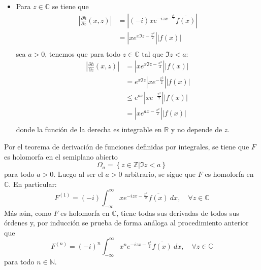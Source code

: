 \documentclass[12pt]{report}
\theoremstyle{largebreak}
\renewcommand{\leq}{\ensuremath{\leqslant}}
\newcommand\abs[1]{\ensuremath{\left|#1\right|}}
\newcommand\conj[1]{\ensuremath{\overline{#1}}}
\begin{document}
\begin{sol}
\begin{itemize}
            \item Para $z\in\mathbb{C}$ se tiene que
            \begin{equation*}
                \begin{split}
                    \abs{\frac{\partial h}{\partial z}(x,z)}&=\abs{(-i)xe^{-izx-^{\frac{x^2}{2}}}\conj{f(x)}}\\
                    &=\abs{xe^{x\Im z-\frac{x^2}{2}}}\abs{f(x)}\\
                \end{split}
            \end{equation*}
            sea $a>0$, tenemos que para todo $z\in\mathbb{C}$ tal que $\Im z<a$:
            \begin{equation*}
                \begin{split}
                    \abs{\frac{\partial h}{\partial z}(x,z)}&=\abs{xe^{x\Im z-\frac{x^2}{2}}}\abs{f(x)}\\
                    &=e^{x\Im z} \abs{xe^{-\frac{x^2}{2}}}\abs{f(x)}\\
                    &\leq e^{ ax}\abs{xe^{-\frac{x^2}{2}}}\abs{f(x)}\\
                    &=\abs{xe^{ax-\frac{x^2}{2}}}\abs{f(x)}\\
                \end{split}
            \end{equation*}
            donde la función de la derecha es integrable en $\mathbb{R}$ y no depende de $z$.
        \end{itemize}
        Por el teorema de derivación de funciones definidas por integrales, se tiene que $F$ es holomorfa en el semiplano abierto
        \begin{equation*}
            \Omega_a=\left\{z\in\mathbb{Z}\Big|\Im z<a \right\}
        \end{equation*}
        para todo $a>0$. Luego al ser el $a>0$ arbitrario, se sigue que $F$ es homolorfa en $\mathbb{C}$. En particular:
        \begin{equation*}
            F^{(1)}=(-i)\int_{-\infty}^\infty xe^{ -izx-\frac{x^2}{2}}\conj{f(x)}\:dx,\quad\forall z\in\mathbb{C}
        \end{equation*}
        Más aún, como $F$ es holomorfa en $\mathbb{C}$, tiene todas sus derivadas de todos sus órdenes y, por inducción se prueba de forma análoga al procedimiento anterior que
        \begin{equation*}
            F^{(n)}=(-i)^n\int_{-\infty}^\infty x^ne^{ -izx-\frac{x^2}{2}}\conj{f(x)}\:dx,\quad\forall z\in\mathbb{C}
        \end{equation*}
        para todo $n\in\mathbb{N}$.


\end{sol}
\end{document}
